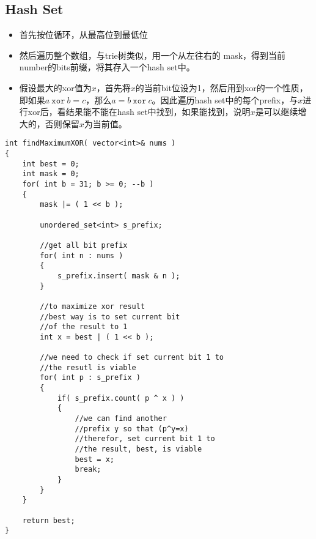 \subsection{Hash Set}
\begin{itemize}
\item 首先按位循环，从最高位到最低位
\item 然后遍历整个数组，与trie树类似，用一个从左往右的 mask，得到当前number的bits前缀，将其存入一个hash set中。
\item 假设最大的xor值为$x$，首先将$x$的当前bit位设为1，然后用到xor的一个性质，即如果$a\ \texttt{xor}\ b = c$，那么$a=b\ \texttt{xor}\ c$。因此遍历hash set中的每个prefix，与$x$进行xor后，看结果能不能在hash set中找到，如果能找到，说明$x$是可以继续增大的，否则保留$x$为当前值。
\end{itemize}

\setcounter{lstlisting}{0}
\begin{lstlisting}[style=customc, caption={Hash Set}]
int findMaximumXOR( vector<int>& nums )
{
    int best = 0;
    int mask = 0;
    for( int b = 31; b >= 0; --b )
    {
        mask |= ( 1 << b );

        unordered_set<int> s_prefix;

        //get all bit prefix
        for( int n : nums )
        {
            s_prefix.insert( mask & n );
        }

        //to maximize xor result
        //best way is to set current bit
        //of the result to 1
        int x = best | ( 1 << b );

        //we need to check if set current bit 1 to
        //the resutl is viable
        for( int p : s_prefix )
        {
            if( s_prefix.count( p ^ x ) )
            {
                //we can find another
                //prefix y so that (p^y=x)
                //therefor, set current bit 1 to
                //the result, best, is viable
                best = x;
                break;
            }
        }
    }

    return best;
}
\end{lstlisting}
